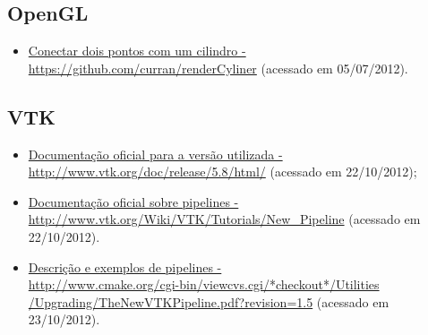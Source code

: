 \subsection{OpenGL}
\begin{itemize}
  \item \href{https://github.com/curran/renderCyliner}{Conectar dois pontos com um cilindro - https://github.com/curran/renderCyliner} (acessado em 05/07/2012).
\end{itemize}

\subsection{VTK}
\begin{itemize}
  \item \href{http://www.vtk.org/doc/release/5.8/html/}{Documentação oficial para a versão utilizada - \\http://www.vtk.org/doc/release/5.8/html/} (acessado em 22/10/2012);\label{vtk-5.8}
  \item \href{http://www.vtk.org/Wiki/VTK/Tutorials/New\_Pipeline}{Documentação oficial sobre pipelines - \\http://www.vtk.org/Wiki/VTK/Tutorials/New\_Pipeline} (acessado em 22/10/2012).
  \item \href{http://www.cmake.org/cgi-bin/viewcvs.cgi/*checkout*/Utilities/Upgrading/TheNewVTKPipeline.pdf?revision=1.5}{Descrição e exemplos de pipelines - \\http://www.cmake.org/cgi-bin/viewcvs.cgi/*checkout*/Utilities\\/Upgrading/TheNewVTKPipeline.pdf?revision=1.5} (acessado em 23/10/2012).
\end{itemize}


